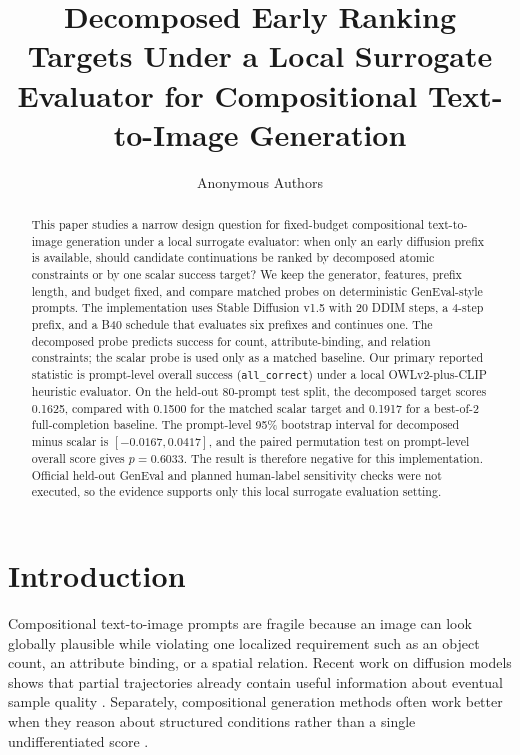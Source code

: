 \documentclass{article}
\title{Decomposed Early Ranking Targets Under a Local Surrogate Evaluator for Compositional Text-to-Image Generation}
\author{Anonymous Authors}
\newcommand{\budget}{B40}
\begin{document}
\maketitle

\begin{abstract}
This paper studies a narrow design question for fixed-budget compositional text-to-image generation under a local surrogate evaluator: when only an early diffusion prefix is available, should candidate continuations be ranked by decomposed atomic constraints or by one scalar success target? We keep the generator, features, prefix length, and budget fixed, and compare matched probes on deterministic GenEval-style prompts. The implementation uses Stable Diffusion v1.5 with 20 DDIM steps, a 4-step prefix, and a \budget{} schedule that evaluates six prefixes and continues one. The decomposed probe predicts success for count, attribute-binding, and relation constraints; the scalar probe is used only as a matched baseline. Our primary reported statistic is prompt-level overall success (\texttt{all\_correct}) under a local OWLv2-plus-CLIP heuristic evaluator. On the held-out 80-prompt test split, the decomposed target scores 0.1625, compared with 0.1500 for the matched scalar target and 0.1917 for a best-of-2 full-completion baseline. The prompt-level 95\% bootstrap interval for decomposed minus scalar is $[-0.0167, 0.0417]$, and the paired permutation test on prompt-level overall score gives $p=0.6033$. The result is therefore negative for this implementation. Official held-out GenEval and planned human-label sensitivity checks were not executed, so the evidence supports only this local surrogate evaluation setting.
\end{abstract}

\section{Introduction}
Compositional text-to-image prompts are fragile because an image can look globally plausible while violating one localized requirement such as an object count, an attribute binding, or a spatial relation. Recent work on diffusion models shows that partial trajectories already contain useful information about eventual sample quality \citep{guo2026earlyqualityassessmenttexttoimage,cui2026diffusionprobegeneratedimage}. Separately, compositional generation methods often work better when they reason about structured conditions rather than a single undifferentiated score \citep{liu2022compositionalvisual,feng2022trainingfreestructureddiffusionguidance,chefer2023attendexcite,wang2024divideconquerlanguagemodels,izadi2025finegrainedalignmentnoiserefinement,jaiswal2026iterativerefinementimprovescompositional}.
\end{document}
